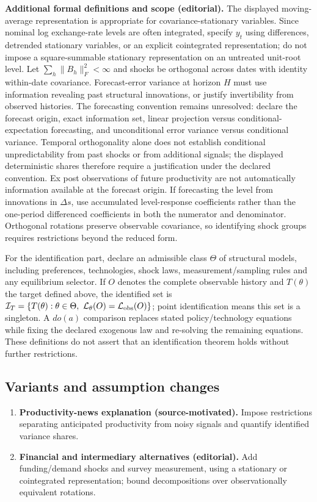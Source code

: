 \documentclass[11pt,a4paper]{article}
\begin{document}
\textbf{Additional formal definitions and scope (editorial).} The displayed moving-average representation is appropriate for covariance-stationary variables. Since nominal log exchange-rate levels are often integrated, specify \(y_t\) using differences, detrended stationary variables, or an explicit cointegrated representation; do not impose a square-summable stationary representation on an untreated unit-root level. Let \(\sum_h\|B_h\|_F^2<\infty\) and shocks be orthogonal across dates with identity within-date covariance. Forecast-error variance at horizon \(H\) must use information revealing past structural innovations, or justify invertibility from observed histories. The forecasting convention remains unresolved: declare the forecast origin, exact information set, linear projection versus conditional-expectation forecasting, and unconditional error variance versus conditional variance. Temporal orthogonality alone does not establish conditional unpredictability from past shocks or from additional signals; the displayed deterministic shares therefore require a justification under the declared convention. Ex post observations of future productivity are not automatically information available at the forecast origin. If forecasting the level from innovations in \(\Delta s\), use accumulated level-response coefficients rather than the one-period differenced coefficients in both the numerator and denominator. Orthogonal rotations preserve observable covariance, so identifying shock groups requires restrictions beyond the reduced form.

For the identification part, declare an admissible class \(\Theta\) of structural models, including preferences, technologies, shock laws, measurement/sampling rules and any equilibrium selector. If \(O\) denotes the complete observable history and \(T(\theta)\) the target defined above, the identified set is \(\mathcal I_T=\{T(\theta):\theta\in\Theta,\ \mathcal L_\theta(O)=\mathcal L_{\rm obs}(O)\}\); point identification means this set is a singleton. A \(do(a)\) comparison replaces stated policy/technology equations while fixing the declared exogenous law and re-solving the remaining equations. These definitions do not assert that an identification theorem holds without further restrictions.
\subsection*{Variants and assumption changes}
\begin{enumerate}
\item \textbf{Productivity-news explanation (source-motivated).} Impose restrictions separating anticipated productivity from noisy signals and quantify identified variance shares.
\item \textbf{Financial and intermediary alternatives (editorial).} Add funding/demand shocks and survey measurement, using a stationary or cointegrated representation; bound decompositions over observationally equivalent rotations.
\end{enumerate}
\end{document}
